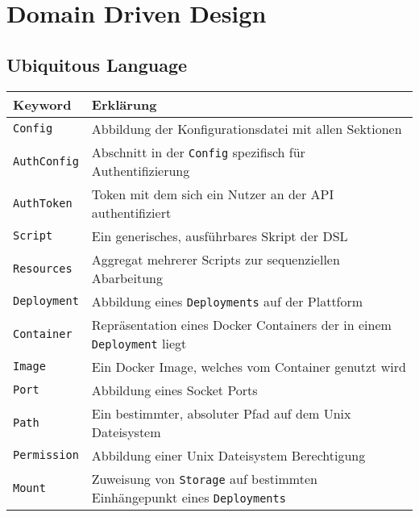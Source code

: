 \section{Domain Driven Design}
\label{sec:domain_driven_design}

\subsection{Ubiquitous Language}
\label{subsec:ubiquitous_language}

\begin{table}[H]
    \centering
    
    \settowidth{}
    \begin{tabulary}{\textwidth}{|L|L|} 
        \hline
        \textbf{Keyword} & \textbf{Erklärung} \\
        \hline
        \texttt{Config}  & Abbildung der Konfigurationsdatei mit allen Sektionen \\
        \hline
        \texttt{AuthConfig} & Abschnitt in der \texttt{Config} spezifisch für Authentifizierung \\
        \hline
        \texttt{AuthToken} & Token mit dem sich ein Nutzer an der API authentifiziert \\
        \hline
        \texttt{Script} & Ein generisches, ausführbares Skript der DSL \\
        \hline
        \texttt{Resources} & Aggregat mehrerer Scripts zur sequenziellen Abarbeitung \\
        \hline
        \texttt{Deployment} & Abbildung eines \texttt{Deployments} auf der Plattform \\
        \hline
        \texttt{Container} & Repräsentation eines Docker Containers der in einem \texttt{Deployment} liegt \\
        \hline
        \texttt{Image} & Ein Docker Image, welches vom Container genutzt wird \\
        \hline
        \texttt{Port} & Abbildung eines Socket Ports \\
        \hline
        \texttt{Path} & Ein bestimmter, absoluter Pfad auf dem Unix Dateisystem \\
        \hline
        \texttt{Permission} & Abbildung einer Unix Dateisystem Berechtigung \\
        \hline
        \texttt{Mount} & Zuweisung von \texttt{Storage} auf bestimmten Einhängepunkt eines \texttt{Deployments} \\
        \hline

\end{tabulary}
\end{table}
